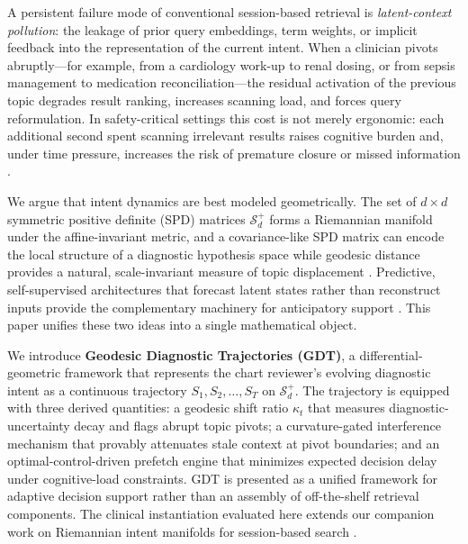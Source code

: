 \documentclass[11pt]{article}
\begin{document}
A persistent failure mode of conventional session-based retrieval is \emph{latent-context pollution}: the leakage of prior query embeddings, term weights, or implicit feedback into the representation of the current intent. When a clinician pivots abruptly---for example, from a cardiology work-up to renal dosing, or from sepsis management to medication reconciliation---the residual activation of the previous topic degrades result ranking, increases scanning load, and forces query reformulation. In safety-critical settings this cost is not merely ergonomic: each additional second spent scanning irrelevant results raises cognitive burden and, under time pressure, increases the risk of premature closure or missed information \citep{topol2019,croskerry2003}.

We argue that intent dynamics are best modeled geometrically. The set of $d\times d$ symmetric positive definite (SPD) matrices $\mathcal{S}_d^+$ forms a Riemannian manifold under the affine-invariant metric, and a covariance-like SPD matrix can encode the local structure of a diagnostic hypothesis space while geodesic distance provides a natural, scale-invariant measure of topic displacement \citep{bronstein2017,lopez2021}. Predictive, self-supervised architectures that forecast latent states rather than reconstruct inputs provide the complementary machinery for anticipatory support \citep{lecun2022,assran2023_ijepa}. This paper unifies these two ideas into a single mathematical object.

We introduce \textbf{Geodesic Diagnostic Trajectories (GDT)}, a differential-geometric framework that represents the chart reviewer's evolving diagnostic intent as a continuous trajectory $S_1, S_2, \dots, S_T$ on $\mathcal{S}_d^+$. The trajectory is equipped with three derived quantities: a geodesic shift ratio $\kappa_t$ that measures diagnostic-uncertainty decay and flags abrupt topic pivots; a curvature-gated interference mechanism that provably attenuates stale context at pivot boundaries; and an optimal-control-driven prefetch engine that minimizes expected decision delay under cognitive-load constraints. GDT is presented as a unified framework for adaptive decision support rather than an assembly of off-the-shelf retrieval components. The clinical instantiation evaluated here extends our companion work on Riemannian intent manifolds for session-based search \citep{cma2026,cma2026_clinical}.
\end{document}
